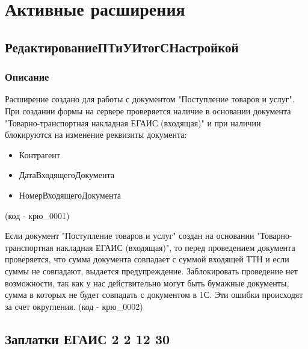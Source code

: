 \section{Активные расширения}

\subsection{РедактированиеПТиУИтогСНастройкой}\label{500}
\subsubsection{Описание}
Расширение создано для работы с документом "Поступление товаров и услуг". При создании формы на сервере проверяется наличие в основании документа "Товарно-транспортная накладная ЕГАИС (входящая)" и при наличии блокируются на изменение реквизиты документа:
\begin{itemize}[label={--}]
	\item Контрагент
	\item ДатаВходящегоДокумента
	\item НомерВходящегоДокумента
\end{itemize}
(код - крю\_0001)\par
Если документ  "Поступление товаров и услуг" создан на основании "Товарно-транспортная накладная ЕГАИС (входящая)", то перед проведением документа проверяется, что сумма документа совпадает с суммой входящей ТТН и если суммы не совпадают, выдается предупреждение. Заблокировать проведение нет возможности, так как у нас действительно могут быть бумажные документы, сумма в которых не будет совпадать с документом в 1С. Эти ошибки происходят за счет округления.
(код - крю\_0002)\par

\subsection{Заплатки ЕГАИС 2 2 12 30}\label{501}
